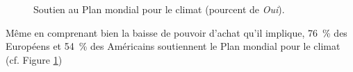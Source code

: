 \documentclass[a5paper,french,openany]{memoir}
\begin{document}
\begin{figure}[h!]
  \caption[Soutien au Plan mondial pour le climat]{Soutien au Plan mondial pour le climat (pourcent de \textit{Oui}).} 
  \label{fig:gcs_support} 
\end{figure}

Même en comprenant bien la baisse de pouvoir d'achat qu'il implique, 76~\% des Européens et 54~\% des Américains soutiennent le Plan mondial pour le climat (cf. Figure \ref{fig:gcs_support})
\end{document}
